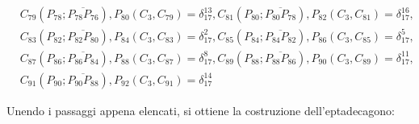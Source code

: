 \begin{enumerate}
\begin{align*}
&C_{79}(P_{78};\overline{P_{78} P_{76}}), P_{80}(C_{3}, C_{79}) = \delta_{17}^{13}, C_{81}(P_{80};\overline{P_{80} P_{78}}), P_{82}(C_{3}, C_{81}) = \delta_{17}^{16},\\
&C_{83}(P_{82};\overline{P_{82} P_{80}}), P_{84}(C_{3}, C_{83})= \delta_{17}^{2}, C_{85}(P_{84};\overline{P_{84} P_{82}}), P_{86}(C_{3}, C_{85})= \delta_{17}^{5},\\
&C_{87}(P_{86};\overline{P_{86} P_{84}}), P_{88}(C_{3}, C_{87})= \delta_{17}^{8}, C_{89}(P_{88};\overline{P_{88} P_{86}}), P_{90}(C_{3}, C_{89})= \delta_{17}^{11},\\
&C_{91}(P_{90};\overline{P_{90} P_{88}}), P_{92}(C_{3}, C_{91}) = \delta_{17}^{14} 
\end{align*}
\end{enumerate}

Unendo i passaggi appena elencati, si ottiene la costruzione dell'eptadecagono:
